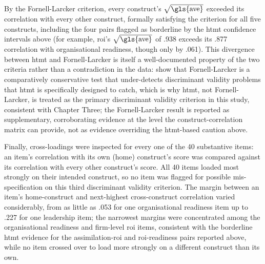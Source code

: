 \begin{table}[htbp]
	\centering
	\caption{Fornell-Larcker discriminant validity matrix (diagonal = $\sqrt{\mathrm{\gls{ave}}}$)}
	\label{tab:discriminant_fl}
\end{table}

By the Fornell-Larcker criterion, every construct's $\sqrt{\mathrm{\gls{ave}}}$ exceeded its correlation with every other construct, formally satisfying the criterion for all five constructs, including the four pairs flagged as borderline by the \gls{htmt} confidence intervals above (for example, \gls{roi}'s $\sqrt{\mathrm{\gls{ave}}}$ of .938 exceeds its .877 correlation with organisational readiness, though only by .061). This divergence between \gls{htmt} and Fornell-Larcker is itself a well-documented property of the two criteria rather than a contradiction in the data: \textcite{Henseler2015} show that Fornell-Larcker is a comparatively conservative test that under-detects discriminant validity problems that \gls{htmt} is specifically designed to catch, which is why \gls{htmt}, not Fornell-Larcker, is treated as the primary discriminant validity criterion in this study, consistent with Chapter Three; the Fornell-Larcker result is reported as supplementary, corroborating evidence at the level the construct-correlation matrix can provide, not as evidence overriding the \gls{htmt}-based caution above.

Finally, cross-loadings were inspected for every one of the 40 substantive items: an item's correlation with its own (home) construct's score was compared against its correlation with every other construct's score. All 40 items loaded most strongly on their intended construct, so no item was flagged for possible mis-specification on this third discriminant validity criterion. The margin between an item's home-construct and next-highest cross-construct correlation varied considerably, from as little as .053 for one organisational readiness item up to .227 for one leadership item; the narrowest margins were concentrated among the organisational readiness and firm-level \gls{roi} items, consistent with the borderline \gls{htmt} evidence for the assimilation-\gls{roi} and \gls{roi}-readiness pairs reported above, while no item crossed over to load more strongly on a different construct than its own.

